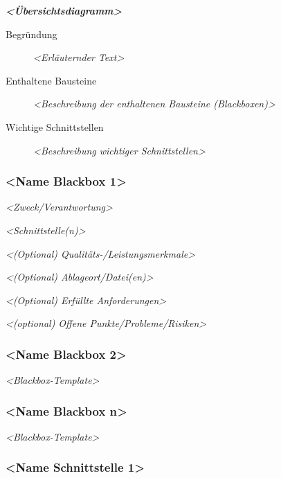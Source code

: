 \documentclass[
]{article}
\begin{document}
\emph{\textbf{\textless Übersichtsdiagramm\textgreater{}}}

\begin{description}
\item[Begründung]
\emph{\textless Erläuternder Text\textgreater{}}
\item[Enthaltene Bausteine]
\emph{\textless Beschreibung der enthaltenen Bausteine
(Blackboxen)\textgreater{}}
\item[Wichtige Schnittstellen]
\emph{\textless Beschreibung wichtiger Schnittstellen\textgreater{}}
\end{description}

\hypertarget{__name_blackbox_1}{%
\subsubsection{\textless Name Blackbox
1\textgreater{}}\label{__name_blackbox_1}}

\emph{\textless Zweck/Verantwortung\textgreater{}}

\emph{\textless Schnittstelle(n)\textgreater{}}

\emph{\textless(Optional) Qualitäts-/Leistungsmerkmale\textgreater{}}

\emph{\textless(Optional) Ablageort/Datei(en)\textgreater{}}

\emph{\textless(Optional) Erfüllte Anforderungen\textgreater{}}

\emph{\textless(optional) Offene Punkte/Probleme/Risiken\textgreater{}}

\hypertarget{__name_blackbox_2}{%
\subsubsection{\textless Name Blackbox
2\textgreater{}}\label{__name_blackbox_2}}

\emph{\textless Blackbox-Template\textgreater{}}

\hypertarget{__name_blackbox_n}{%
\subsubsection{\textless Name Blackbox
n\textgreater{}}\label{__name_blackbox_n}}

\emph{\textless Blackbox-Template\textgreater{}}

\hypertarget{__name_schnittstelle_1}{%
\subsubsection{\textless Name Schnittstelle
1\textgreater{}}\label{__name_schnittstelle_1}}
\end{document}
